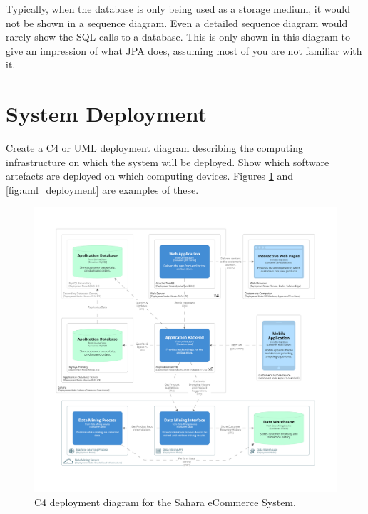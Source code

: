 \documentclass{csse4400}
\begin{document}
Typically, when the database is only being used as a storage medium, it would not be shown in a sequence diagram.
Even a detailed sequence diagram would rarely show the SQL calls to a database.
This is only shown in this diagram to give an impression of what JPA does, assuming most of you are not familiar with it.



\newpage
\section{System Deployment}
Create a C4 or UML deployment diagram describing the computing infrastructure on which the system will be deployed.
Show which software artefacts are deployed on which computing devices.
Figures \ref{fig:c4_deployment} and \ref{fig:uml_deployment} are examples of these.

\begin{figure}[h!]
    \centering
    \begin{adjustwidth}{-7.5mm}{-7.5mm}
        \includegraphics[trim=195 235 195 198,clip,width=0.95\paperwidth]{../../notes/views/images/c4/deployment_diagram.png}
    \end{adjustwidth}
    \caption{C4 deployment diagram for the Sahara eCommerce System.}
    \label{fig:c4_deployment}
\end{figure}
\end{document}
